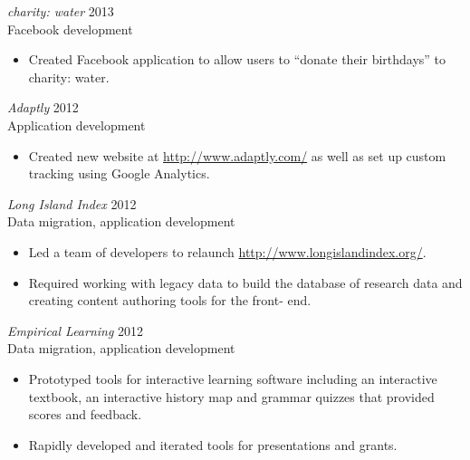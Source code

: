 \documentclass[line,margin]{res}
\begin{document}
\begin{resume}
\begin{itemize}
    \end{itemize}

    {\sl charity: water}
    \hfill 2013 \\
    Facebook development
    \begin{itemize} \itemsep -2pt
        \item
            Created Facebook application to allow users to ``donate their
            birthdays'' to charity: water.

    \end{itemize}

    {\sl Adaptly}
    \hfill 2012 \\
    Application development
    \begin{itemize} \itemsep -2pt
        \item
            Created new website at \url{http://www.adaptly.com/} as well as
            set up custom tracking using Google Analytics.

    \end{itemize}

    {\sl Long Island Index}
    \hfill 2012 \\
    Data migration, application development
    \begin{itemize} \itemsep -2pt
        \item
            Led a team of developers to relaunch
            \url{http://www.longislandindex.org/}.

        \item
            Required working with legacy data to build the database of
            research data and creating content authoring tools for the front-
            end.

    \end{itemize}

    \begin{samepage}
    {\sl Empirical Learning}
    \hfill 2012 \\
    Data migration, application development
    \begin{itemize} \itemsep -2pt
        \item
            Prototyped tools for interactive learning software including an
            interactive textbook, an interactive history map and grammar
            quizzes that provided scores and feedback.

        \item
            Rapidly developed and iterated tools for presentations and grants.


\end{itemize}
\end{samepage}
\end{resume}
\end{document}

